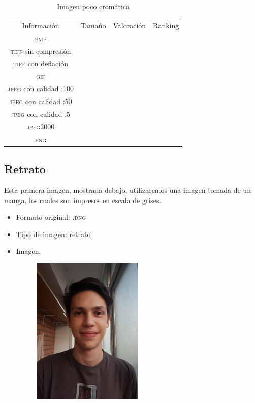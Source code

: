 \documentclass[11pt,a4paper]{article}
\begin{document}
\begin{table}[H]
\centering
\begin{tabular}{|c|c|c|c|}
\hline
\diagbox[width=15em]{\textit{Códec}/Formato}{\\Información} & Tamaño & Valoración & Ranking \\
\hline
\textsc{bmp} &  &  &  \\ \hline
\textsc{tiff} sin compresión &  &  &  \\ \hline
\textsc{tiff} con deflación &  &  &  \\ \hline
\textsc{gif} &  &  &  \\ \hline
\textsc{jpeg} con calidad :100 &  &  &  \\ \hline
\textsc{jpeg} con calidad :50 &  &  &  \\ \hline
\textsc{jpeg} con calidad :5 &  &  &  \\ \hline
\textsc{jpeg2000} &  &  &  \\ \hline
\textsc{png} &  &  &  \\ \hline
\end{tabular}
\caption{Imagen poco cromática}
\label{tab:my-table}
\end{table}


\subsection{Retrato}

Esta primera imagen, mostrada debajo, utilizaremos una imagen tomada de un manga, los cuales son impresos en escala de grises.

\begin{itemize}
	\item Formato original: \textsc{.dng}
	\item Tipo de imagen: retrato
	\item Imagen:
		\begin{figure}[H]
		\centering
			\includegraphics[width=0.5\textwidth]{Fotos/retrato.jpg}
		\end{figure}	
\end{itemize}
\end{document}
